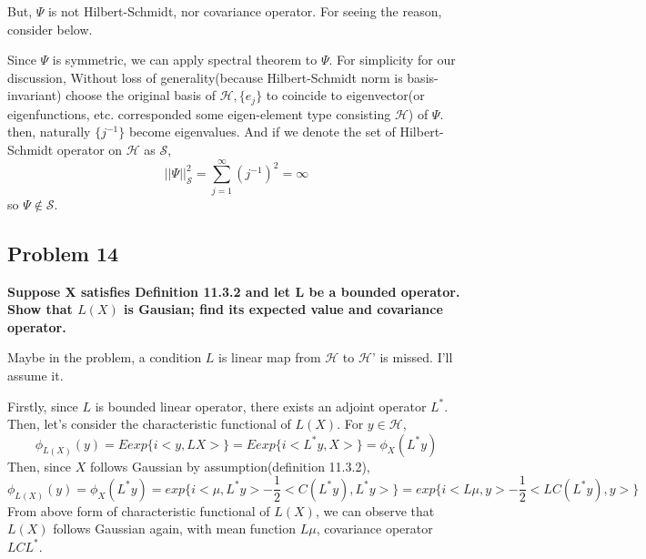\documentclass{article}
\begin{document}
But, $\Psi$ is not Hilbert-Schmidt, nor covariance operator. For seeing the reason, consider below.

Since $\Psi$ is symmetric, we can apply spectral theorem to $\Psi$.
For simplicity for our discussion, Without loss of generality(because Hilbert-Schmidt norm is basis-invariant) 
choose the original basis of $\mathcal{H}, \{e_j\}$ to coincide to eigenvector(or eigenfunctions, etc. corresponded some eigen-element type consisting $\mathcal{H}$) of $\Psi$.
then, naturally $\{j^{-1}\}$ become eigenvalues. And if we denote the set of Hilbert-Schmidt operator on $\mathcal{H}$ as $\mathcal{S}$,
\[||\Psi||_{\mathcal{S}}^{2}=\sum_{j=1}^{\infty}(j^{-1})^2=\infty\]
so $\Psi\notin\mathcal{S}$.



\subsection{Problem 14}
\textbf{
    Suppose X satisfies Definition 11.3.2 and let L be a bounded operator. 
    Show that $L(X)$ is Gausian; find its expected value and covariance operator.
}

Maybe in the problem, a condition $L$ is linear map from $\mathcal{H}$ to $\mathcal{H}$' is missed. I'll assume it.

Firstly, since $L$ is bounded linear operator, there exists an adjoint operator $L^*$.
Then, let's consider the characteristic functional of $L(X)$. 
For $y\in\mathcal{H}$,
\[\phi_{L(X)}(y)=Eexp\{i<y,LX>\}=Eexp\{i<L^*y,X>\}=\phi_X(L^*y)\]
Then, since $X$ follows Gaussian by assumption(definition 11.3.2),
\[\phi_{L(X)}(y)=\phi_X(L^*y)=exp\{i<\mu,L^*y>-\frac{1}{2}<C(L^*y),L^*y>\}
=exp\{i<L\mu,y>-\frac{1}{2}<LC(L^*y),y>\}\]
From above form of characteristic functional of $L(X)$, we can observe that $L(X)$ follows Gaussian again, with
mean function $L\mu$, covariance operator $LCL^*$.
\end{document}
